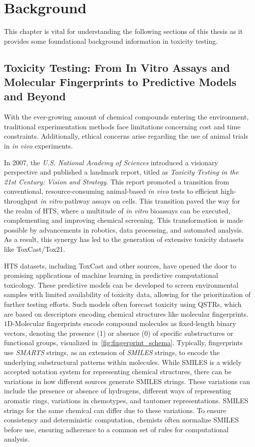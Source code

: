 \chapter{Background}\label{chap:background}
This chapter is vital for understanding the following sections of this thesis as it provides some foundational background information in toxicity testing.

\section{Toxicity Testing: From In Vitro Assays and Molecular Fingerprints to Predictive Models and Beyond}\label{sec:toxicity_testing}

With the ever-growing amount of chemical compounds entering the environment, traditional experimentation methods face limitations concerning cost and time constraints. Additionally, ethical concerns arise regarding the use of animal trials in \emph{in vivo} experiments.

In 2007, the \emph{U.S. National Academy of Sciences} introduced a visionary perspective and published a landmark report, titled as \emph{Toxicity Testing in the 21st Century: Vision and Strategy}. This report promoted a transition from conventional, resource-consuming animal-based \emph{in vivo} tests to efficient high-throughput \emph{in vitro} pathway assays on cells. This transition paved the way for the realm of HTS, where a multitude of \emph{in vitro} bioassays can be executed, complementing and improving chemical screening. This transformation is made possible by advancements in robotics, data processing, and automated analysis. As a result, this synergy has led to the generation of extensive toxicity datasets like ToxCast/Tox21.
 
HTS datasets, including ToxCast and other sources, have opened the door to promising applications of machine learning in predictive computational toxicology. These predictive models can be developed to screen environmental samples with limited availability of toxicity data, allowing for the prioritization of further testing efforts. Such models often forecast toxicity using QSTRs, which are based on descriptors encoding chemical structures like molecular fingerprints. $1$D-Molecular fingerprints encode compound molecules as fixed-length binary vectors, denoting the presence (1) or absence (0) of specific substructures or functional groups, visualized in~\ref{fig:fingerprint_schema}. Typically, fingerprints use \emph{SMARTS} strings, as an extension of \emph{SMILES} strings, to encode the underlying substructural patterns within molecules. While SMILES is a widely accepted notation system for representing chemical structures, there can be variations in how different sources generate SMILES strings. These variations can include the presence or absence of hydrogens, different ways of representing aromatic rings, variations in chemotypes, and tautomer representations. SMILES strings for the same chemical can differ due to these variations. To ensure consistency and deterministic computation, chemists often normalize SMILES before use, ensuring adherence to a common set of rules for computational analysis.

